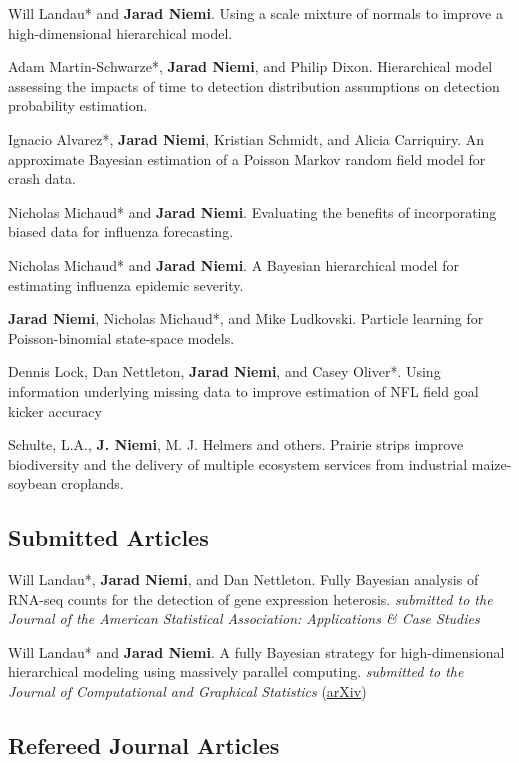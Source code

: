 \documentclass[overlapped,line]{res}
\begin{document}
\begin{resume}
Will Landau* and {\bf Jarad Niemi}. Using a scale mixture of normals to improve a high-dimensional hierarchical model.

Adam Martin-Schwarze*, {\bf Jarad Niemi}, and Philip Dixon. Hierarchical model assessing the impacts of time to detection distribution assumptions on detection probability estimation.

Ignacio Alvarez*, {\bf Jarad Niemi}, Kristian Schmidt, and Alicia Carriquiry. An approximate Bayesian estimation of a Poisson Markov random field model for crash data.


Nicholas Michaud* and {\bf Jarad Niemi}. Evaluating the benefits of incorporating biased data for influenza forecasting.

Nicholas Michaud* and {\bf Jarad Niemi}. A Bayesian hierarchical model for estimating influenza epidemic severity.

{\bf Jarad Niemi}, Nicholas Michaud*, and Mike Ludkovski. Particle learning for Poisson-binomial state-space models.

Dennis Lock, Dan Nettleton, {\bf Jarad Niemi}, and Casey Oliver*. Using information underlying missing data to improve estimation of NFL field goal kicker accuracy

Schulte, L.A., {\bf J. Niemi}, M. J. Helmers and others. Prairie strips improve biodiversity and the delivery of multiple ecosystem services from industrial maize-soybean croplands.

\subsection{\bf Submitted Articles} \vspace{-0.2in}

Will Landau*, {\bf Jarad Niemi}, and Dan Nettleton. Fully Bayesian analysis of RNA-seq counts for the detection of gene expression heterosis. \emph{submitted to the Journal of the American Statistical Association: Applications \& Case Studies}

Will Landau* and {\bf Jarad Niemi}. A fully Bayesian strategy for
high-dimensional hierarchical modeling using
massively parallel computing. \emph{submitted to the Journal of Computational and Graphical Statistics} (\href{https://arxiv.org/abs/1606.06659}{arXiv})

\subsection{\bf Refereed Journal Articles} \vspace{-0.2in}


\end{resume}
\end{document}
